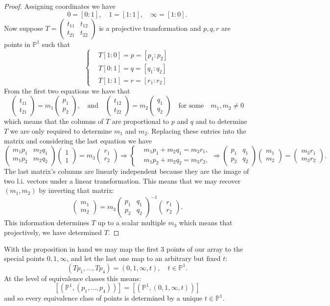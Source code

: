 \documentclass[11pt]{article}
\newcommand{\bP}{\mathbb{P}}
\newcommand{\To}{\Rightarrow}           %
\newcommand{\twobyone}[2]{\begin{pmatrix} %
    #1 \\ #2 \end{pmatrix}}
\newcommand{\twobytwo}[4]{\begin{pmatrix} %
    #1 & #2 \\ #3 & #4 \end{pmatrix}}
\theoremstyle{definition}
\theoremstyle{remark}
\numberwithin{theorem}{section}
\begin{document}
\begin{proof}
    Assigning coordinates we have 
    $$0=[0:1],\quad 1=[1:1],\quad \infty=[1:0].$$
    Now suppose $T=\twobytwo{t_{11}}{t_{12}}{t_{21}}{t_{22}}$ is a projective transformation and $p,q,r$ are points in $\bP^1$ such that
    $$
    \left\lbrace
    \begin{aligned}
        &T[1:0]=p=[p_1:p_2]\\
        &T[0:1]=q=[q_1:q_2]\\
        &T[1:1]=r=[r_1:r_2]
    \end{aligned}
    \right.
    $$
    From the first two equations we have that 
    $$\twobyone{t_{11}}{t_{21}}=m_1\twobyone{p_1}{p_2},\quad\text{and}\quad\twobyone{t_{12}}{t_{22}}=m_2\twobyone{q_1}{q_2}\quad\text{for some}\quad m_1,m_2\neq 0$$
    which means that the columns of $T$ are proportional to $p$ and $q$ and to determine $T$ we are only required to determine $m_1$ and $m_2$. Replacing these entries into the matrix and considering the last equation we have 
    $$\twobytwo{m_1p_1}{m_2q_1}{m_1p_2}{m_2q_2}\twobyone{1}{1}=m_3\twobyone{r_1}{r_2}\To \left\lbrace
    \begin{aligned}
        &m_1p_1+m_2q_1=m_3r_1,\\
        &m_1p_2+m_2q_2=m_3r_2,
    \end{aligned}
    \right.\To \twobytwo{p_1}{q_1}{p_2}{q_2}\twobyone{m_1}{m_2}=\twobyone{m_3r_1}{m_3r_2}.$$
    The last matrix's columns are linearly independent because they are the image of two l.i. vectors under a linear transformation. This means that we may recover $(m_1,m_2)$ by inverting that matrix:
    $$\twobyone{m_1}{m_2}=m_3\twobytwo{p_1}{q_1}{p_2}{q_2}^{-1}\twobyone{r_1}{r_2}.$$
    This information determines $T$ up to a scalar multiple $m_3$ which means that projectively, we have determined $T$.
\end{proof}

With the proposition in hand we may map the first $3$ points of our array to the special points $0,1,\infty$, and let the last one map to an arbitrary but fixed $t$:
$$(Tp_1,\dots,Tp_4)=(0,1,\infty,t),\quad t\in\bP^1.$$
At the level of equivalence classes this means:
$$[(\bP^1,(p_1,\dots,p_4))]=[(\bP^1,(0,1,\infty,t))]$$
and so every equivalence class of points is determined by a unique $t\in\bP^1$.
\end{document}
